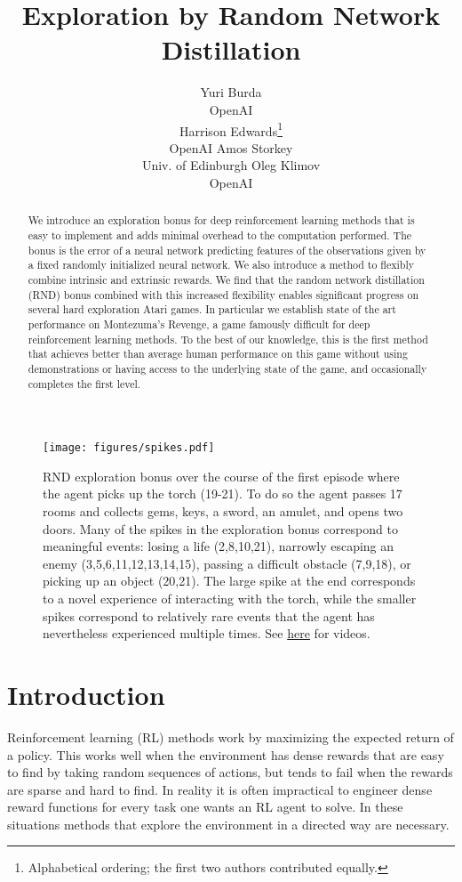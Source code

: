 \documentclass{article} \usepackage[dvipsnames]{xcolor}
\title{Exploration by Random Network Distillation}
\author{Yuri Burda\\
OpenAI\\
\And
Harrison Edwards\thanks{Alphabetical ordering; the first two authors contributed equally.}\\
OpenAI
\And
Amos Storkey\\
Univ. of Edinburgh
\And
Oleg Klimov\\
OpenAI
}
\begin{document}
\maketitle

\begin{abstract}
We introduce an exploration bonus for deep reinforcement learning methods that is easy to implement and adds minimal overhead to the computation performed. The bonus is the error of a neural network predicting features of the observations given by a fixed randomly initialized neural network. We also introduce a method to flexibly combine intrinsic and extrinsic rewards. We find that the random network distillation (RND) bonus combined with this increased flexibility enables significant progress on several hard exploration Atari games. In particular we establish state of the art performance on Montezuma's Revenge, a game famously difficult for deep reinforcement learning methods. To the best of our knowledge, this is the first method that achieves better than average human performance on this game without using demonstrations or having access to the underlying state of the game, and occasionally completes the first level.\end{abstract}

\begin{figure}[!b]
\vspace*{-8pt}
\centering
\texttt{[image: figures/spikes.pdf]}
\caption{RND exploration bonus over the course of the first episode where the agent picks up the torch (19-21). To do so the agent passes 17 rooms and collects gems, keys, a sword, an amulet, and opens two doors. Many of the spikes in the exploration bonus correspond to meaningful events: losing a life (2,8,10,21), narrowly escaping an enemy (3,5,6,11,12,13,14,15),  passing a difficult obstacle (7,9,18), or picking up an object (20,21). The large spike at the end corresponds to a novel experience of interacting with the torch, while the smaller spikes correspond to relatively rare events that the agent has nevertheless experienced multiple times.  See \href{https://github.com/openai/random-network-distillation}{here} for videos.}
\label{fig:spikes}
\end{figure}


\section{Introduction}
Reinforcement learning (RL) methods work by maximizing the expected return of a policy. This works well when the environment has dense rewards that are easy to find by taking random sequences of actions, but tends to fail when the rewards are sparse and hard to find. In reality it is often impractical to engineer dense reward functions for every task one wants an RL agent to solve. In these situations methods that explore the environment in a directed way are necessary.
\end{document}
